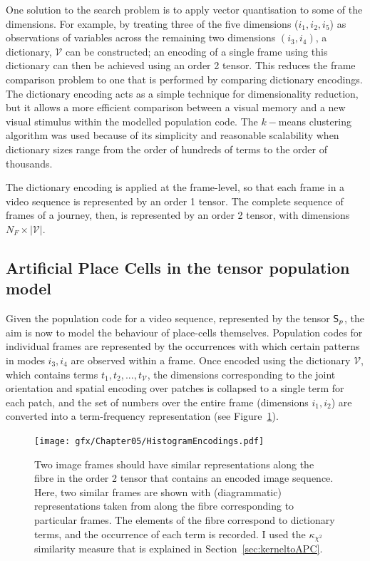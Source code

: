 One solution to the search problem is to apply vector quantisation to some of the dimensions.  For example, by treating three of the five dimensions ($i_1,i_2,i_5$) as observations of variables across the remaining two dimensions $(i_3,i_4)$, a dictionary, $\mathcal{V}$ can be constructed; an encoding of a single frame using this dictionary can then be achieved using an order 2 tensor.  This reduces the frame comparison problem to one that is performed by comparing dictionary encodings. The dictionary encoding acts as a simple technique for dimensionality reduction, but it allows a more efficient comparison between a visual memory and a new visual stimulus within the modelled population code. The $k-$means clustering algorithm was used because of its simplicity and reasonable scalability when dictionary sizes range from the order of hundreds of terms to the order of thousands.

The dictionary encoding is applied at the frame-level, so that each frame in a video sequence is represented by an order 1 tensor.  The complete sequence of frames of a journey, then, is represented by an order 2 tensor, with dimensions $N_F\times|\mathcal{V}|.$ 



\subsection{Artificial Place Cells in the tensor population model}
\label{sec:APC}

Given the population code for a video sequence, represented by the tensor $\mathsf{S}_p$, the aim is now to model the behaviour of place-cells themselves.   Population codes for individual frames are represented by the occurrences with which certain patterns in modes $i_3,i_4$ are observed within a frame.   Once encoded using the dictionary $\mathcal{V}$, which contains terms $t_1,t_2,...,t_{\mathcal{V}}$, the dimensions corresponding to the joint orientation and spatial encoding over patches is collapsed to a single term for each patch, and the set of numbers over the entire frame (dimensions $i_1,i_2$) are converted into a term-frequency representation \cite{Wu:2008} (see Figure~\ref{fig:HistEncodings}).

\begin{figure}
\centering
\texttt{[image: gfx/Chapter05/HistogramEncodings.pdf]}
\caption{Two image frames should have similar representations along the fibre in the order 2 tensor that contains an encoded image sequence.  Here, two similar frames are shown with (diagrammatic) representations taken from along the fibre corresponding to particular frames.  The elements of the fibre correspond to dictionary terms, and the occurrence of each term is recorded.  I used the $\kappa_{\chi^2}$ similarity measure that is explained in Section~\ref{sec:kerneltoAPC}.}
\label{fig:HistEncodings}
\end{figure}


